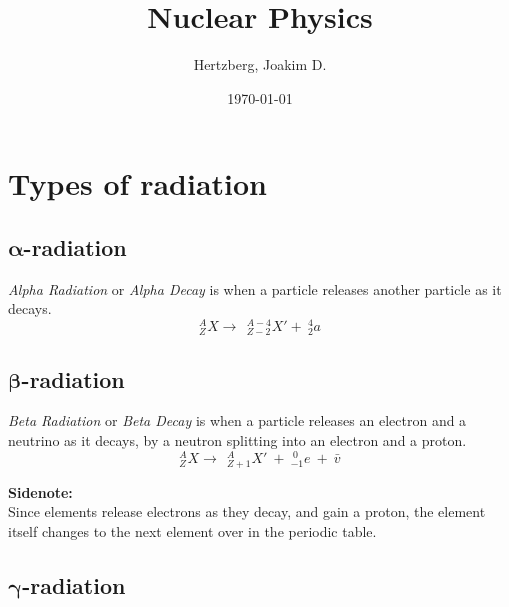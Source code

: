 \documentclass[12pt]{article}
\title{Nuclear Physics}
\author{Hertzberg, Joakim D.}
\date{\today}
\begin{document}
\begin{titlepage}
\maketitle
\begin{center}
\thispagestyle{empty}
\end{center}
\end{titlepage}
\section{Types of radiation}
\subsection{$\bm{\alpha}$-radiation}
\emph{Alpha Radiation} or \emph{Alpha Decay} is when a particle releases another particle as it decays.
$$^{A}_{Z}X \rightarrow \ \ ^{A-4}_{Z-2}X' + \ ^{4}_{2}a$$

\subsection{$\bm{\beta}$-radiation}
\emph{Beta Radiation} or \emph{Beta Decay} is when a particle releases an electron and a neutrino as it decays, by a neutron splitting into an electron and a proton. 
\bigbreak
$$^{A}_{Z}X \rightarrow \ \ ^{A}_{Z+1}X' \ + \ ^{\ 0}_{-1}e \ + \ \bar{v}$$
\begin{boxA}
	\textbf{Sidenote:} \\
Since elements release electrons as they decay, and gain a proton, the element itself changes to the next element over in the periodic table.
\end{boxA}

\subsection{$\bm{\gamma}$-radiation}
\end{document}
